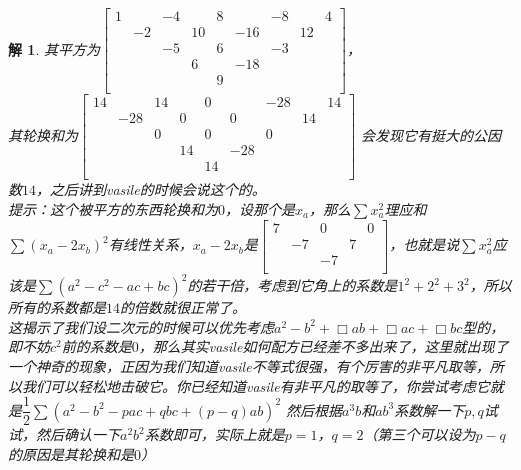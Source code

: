 \documentclass[UTF8]{ctexart}
\newtheorem{2}{解}
\begin{document}
\begin{2}
	其平方为$ \left[\begin{matrix}
		1& &-4& &8& &-8& &4\\
		&-2& &10& &-16& &12&\\
		& &-5& &6& &-3& &\\
		& & &6& &-18& & &\\
		& & & &9& & & &\\
	\end{matrix}\right] $，\\
   其轮换和为$ \left[\begin{matrix}
   	14& &14& &0& &-28& &14\\
   	&-28& &0& &0& &14&\\
   	& &0& &0& &0& &\\
   	& & &14& &-28& & &\\
   	& & & &14& & & &\\
   \end{matrix}\right] $
会发现它有挺大的公因数$ 14 $，之后讲到vasile的时候会说这个的。\\
提示：这个被平方的东西轮换和为$ 0 $，设那个是$ x_a $，那么$ \displaystyle \sum x_a^{2} $理应和$ \displaystyle \sum(x_a-2x_b)^{2} $有线性关系，$ x_a-2x_b $是$ \left[\begin{matrix}
	7& &0& &0\\
	&-7& &7&\\
	& &-7& &\\
\end{matrix}\right] $，也就是说$ \displaystyle \sum x_a^{2} $应该是$ \displaystyle \sum (a^{2}-c^{2}-ac+bc)^{2} $的若干倍，考虑到它角上的系数是$ 1^{2}+2^{2}+3^{2} $，所以所有的系数都是$ 14 $的倍数就很正常了。\\
这揭示了我们设二次元的时候可以优先考虑$ a^{2}-b^{2}+\Box ab+\Box ac+\Box bc $型的，即不妨$ c^{2} $前的系数是$ 0 $，那么其实vasile如何配方已经差不多出来了，这里就出现了一个神奇的现象，正因为我们知道vasile不等式很强，有个厉害的非平凡取等，所以我们可以轻松地击破它。你已经知道vasile有非平凡的取等了，你尝试考虑它就是$ \dfrac{1}{2} \displaystyle \sum (a^{2}-b^{2}-pac+qbc+(p-q)ab)^{2} $
然后根据$ a^{3}b $和$ ab^{3} $系数解一下$ p,q $试试，然后确认一下$ a^{2}b^{2} $系数即可，实际上就是$ p=1 $，$ q=2 $（第三个可以设为$ p-q $的原因是其轮换和是$ 0 $）
\end{2}
\end{document}

